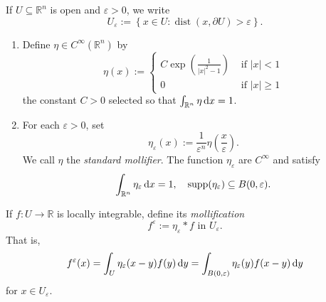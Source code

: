If \( U \subseteq \mathbb{R}^n \) is open and \( \varepsilon > 0 \), we write
\[
  U_{\varepsilon} := \left\lbrace x \in U: \operatorname{dist}(x, \partial U) > \varepsilon \right\rbrace.
\]
\begin{definition}
  \label{definition-standard-mollifier}
  \begin{enumerate}
    \item Define \( \eta \in C^{\infty}(\mathbb{R}^n) \) by
      \[
        \eta(x) := \begin{cases}
          C \exp\left(\frac{1}{\left\lvert x \right\rvert^2 - 1 }\right) & \text{ if } \left\lvert x \right\rvert < 1 \\
        0 & \text{ if } \left\lvert x \right\rvert \geq 1
        \end{cases}
      \]
      the constant \( C > 0 \) selected so that \( \int_{\mathbb{R}^n} \eta \mathop{}\!\mathrm{d} x = 1 \).
    \item For each \( \varepsilon > 0 \), set
      \[
        \eta_{\varepsilon}(x) := \frac{1}{\varepsilon^n}\eta\left(\frac{x}{\varepsilon}\right).
      \]
      We call \( \eta \) the \emph{standard mollifier}.
      The function \( \eta_{\varepsilon} \) are \( C^\infty \) and satisfy
      \[
        \int_{\mathbb{R}^n}\eta_{\varepsilon} \mathop{}\!\mathrm{d} x = 1,\quad \operatorname{supp}(\eta_{\varepsilon}) \subseteq B(0, \varepsilon).
      \]
  \end{enumerate}
\end{definition}

\begin{definition}
  \label{definition-mollification}
  If \( f: U \to \mathbb{R} \) is locally integrable, define its \emph{mollification}
  \[
    f^{\varepsilon} := \eta_{\varepsilon} \ast f \text{ in } U_{\varepsilon}.
  \]
  That is,
  \[
    f^{\varepsilon}(x) = \int_{U}\eta_{\varepsilon}(x - y) f(y) \mathop{}\!\mathrm{d} y = \int_{B(0, \varepsilon)} \eta_{\varepsilon}(y) f(x - y)\mathop{}\!\mathrm{d} y
  \]
  for \( x \in U_{\varepsilon} \).
\end{definition}

